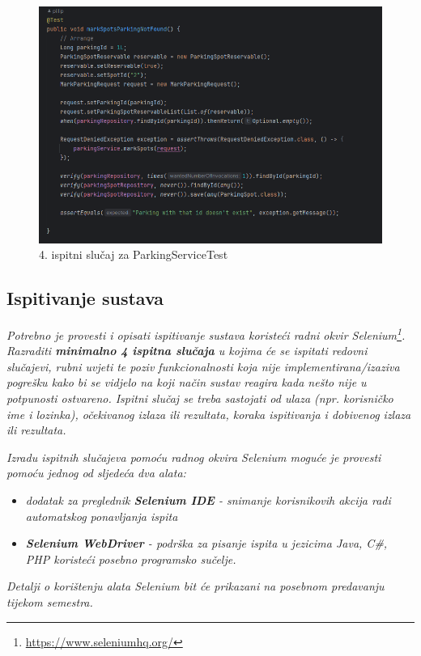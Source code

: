 \begin{figure}[H]
	\includegraphics[width=\textwidth]{slike/markspotparking.png} %
	\centering
	\caption{4. ispitni slučaj za ParkingServiceTest}
	\label{fig:dijagramstanja}
\end{figure}

\subsection{Ispitivanje sustava}

\textit{Potrebno je provesti i opisati ispitivanje sustava koristeći radni okvir Selenium\footnote{\url{https://www.seleniumhq.org/}}. Razraditi \textbf{minimalno 4 ispitna slučaja} u kojima će se ispitati redovni slučajevi, rubni uvjeti te poziv funkcionalnosti koja nije implementirana/izaziva pogrešku kako bi se vidjelo na koji način sustav reagira kada nešto nije u potpunosti ostvareno. Ispitni slučaj se treba sastojati od ulaza (npr. korisničko ime i lozinka), očekivanog izlaza ili rezultata, koraka ispitivanja i dobivenog izlaza ili rezultata.\\ }

\textit{Izradu ispitnih slučajeva pomoću radnog okvira Selenium moguće je provesti pomoću jednog od sljedeća dva alata:}
\begin{itemize}
	\item \textit{dodatak za preglednik \textbf{Selenium IDE} - snimanje korisnikovih akcija radi automatskog ponavljanja ispita	}
	\item \textit{\textbf{Selenium WebDriver} - podrška za pisanje ispita u jezicima Java, C\#, PHP koristeći posebno programsko sučelje.}
\end{itemize}
\textit{Detalji o korištenju alata Selenium bit će prikazani na posebnom predavanju tijekom semestra.}


